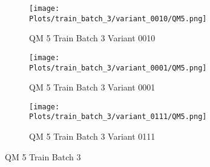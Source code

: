 \documentclass{DissertateFigs}
\begin{document}
\begin{figure}[t!]
\medskip

    \begin{subfigure}{0.47\textwidth}
    \texttt{[image: Plots/train\_batch\_3/variant\_0010/QM5.png]}
    \caption{QM 5 Train Batch 3 Variant 0010}
    \end{subfigure}
    \begin{subfigure}{0.47\textwidth}
    \texttt{[image: Plots/train\_batch\_3/variant\_0001/QM5.png]}
    \caption{QM 5 Train Batch 3 Variant 0001}
    \end{subfigure}

\medskip

    \begin{subfigure}{0.47\textwidth}
    \texttt{[image: Plots/train\_batch\_3/variant\_0111/QM5.png]}
    \caption{QM 5 Train Batch 3 Variant 0111}
    \end{subfigure}
\caption{QM 5 Train Batch 3}
    \end{figure}
\clearpage
\end{document}

